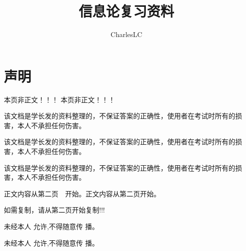 \documentclass[normal,cyan]{elegantnote}
\title{信息论复习资料\footnotemark[1]}
\author{CharlesLC\footnotemark[2]}
\institute{建模小组成员}
\date{\zhtoday}
\begin{document}
\maketitle
\section*{\centering {}声明}
\hspace*{1cm} {\heiti{}本页非正文！！！}   {\heiti{}本页非正文！！！} \par
{\heiti{}该文档是学长发的资料整理的，不保证答案的}{\heiti{}正确性}，{\heiti{}使用者在考试时所有的损害}，{\heiti{}本人不承担任何伤害。}\par
{\heiti{}该文档是学长发的资料整理的，不保证答案的}{\heiti{}正确性}，{\heiti{}使用者在考试时所有的损害}，{\heiti{}本人不承担任何伤害。}\par 
{\heiti{}该文档是学长发的资料整理的，不保证答案的}{\heiti{}正确性}，{\heiti{}使用者在考试时所有的损害}，{\heiti{}本人不承担任何伤害。}\par 
{\heiti{}正文内容从}{\heiti{}第二页}\ \ {\heiti{}开始。}{\heiti{}正文内容从}{\heiti{}第二页}{\heiti{}开始。}\par
{\heiti{}如需复制，请从第二页开始复制!!!}\par
\vspace*{1cm}
{\heiti{}未}{\heiti{}经}{\heiti{}本}{\heiti{}人}
{\heiti{}允}{\heiti{}许,}{\heiti{}不}{\heiti{}得}{\heiti{}随}{\heiti{}意}{\heiti{}传}
{\heiti{}播。}\par
{\heiti{}未}{\heiti{}经}{\heiti{}本}{\heiti{}人}
{\heiti{}允}{\heiti{}许,}{\heiti{}不}{\heiti{}得}{\heiti{}随}{\heiti{}意}{\heiti{}传}
{\heiti{}播。}

\thispagestyle{empty}
\newpage
\section*{\centering  {}}
\end{document}
